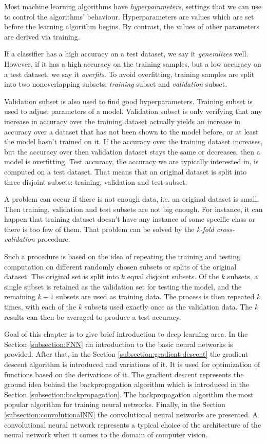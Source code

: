 Most machine learning algorithms have \textit{hyperparameters}, settings that we can use to control the algorithms' behaviour. Hyperparameters are values which are set before the learning algorithm begins. By contrast, the values of other parameters are derived via training. 

If a classifier has a high accuracy on a test dataset, we say it \textit{generalizes} well. However, if it has a high accuracy on the training samples, but a low accuracy on a test dataset, we say it \textit{overfits}. To avoid overfitting, training samples are split into two nonoverlapping subsets: \textit{training} subset and \textit{validation} subset.

Validation subset is also used to find good hyperparameters. Training subset is used to adjust parameters of a model. Validation subset is only verifying that any increase in accuracy over the training dataset actually yields an increase in accuracy over a dataset that has not been shown to the model before, or at least the model hasn't trained on it. If the accuracy over the training dataset increases, but the accuracy over then validation dataset stays the same or decreases, then a model is overfitting. Test accuracy, the accuracy we are typically interested in, is computed on a test dataset. That means that an original dataset is split into three disjoint subsets: training, validation and test subset. 

A problem can occur if there is not enough data, i.e. an original dataset is small. Then training, validation and test subsets are not big enough. For instance, it can happen that training dataset doesn't have any instance of some specific class or there is too few of them. That problem can be solved by the \textit{k-fold cross-validation} procedure.

Such a procedure is based on the idea of repeating the training and testing computation on different randomly chosen subsets or splits of the original dataset. The original set is split into $k$ equal disjoint subsets. Of the $k$ subsets, a single subset is retained as the validation set for testing the model, and the remaining $k-1$ subsets are used as training data. The process is then repeated $k$ times, with each of the $k$ subsets used exactly once as the validation data. The $k$ results can then be averaged to produce a test accuracy. 

Goal of this chapter is to give brief introduction to deep learning area. In the Section \ref{subsection:FNN} an introduction to the basic neural networks is provided. After that, in the Section \ref{subsection:gradient-descent} the gradient descent algorithm is introduced and variations of it. It is used for optimization of functions based on the derivations of it. The gradient descent represents the ground idea behind the backpropagation algorithm which is introduced in the Section \ref{subsection:backpropagation}. The backpropagation algorithm the most popular algorithm for training neural networks. Finally, in the Section \ref{subsection:convolutionalNN} the convolutional neural networks are presented. A convolutional neural network represents a typical choice of the architecture of the neural network when it comes to the domain of computer vision.

